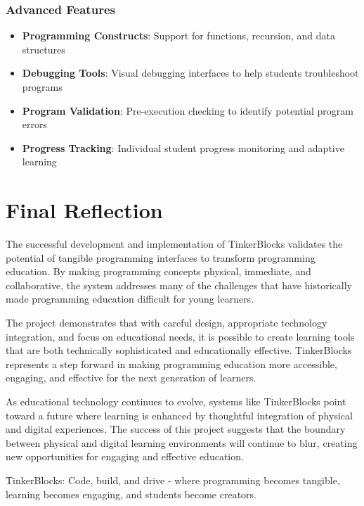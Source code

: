 \subsubsection{Advanced Features}
\begin{itemize}
    \item \textbf{Programming Constructs}: Support for functions, recursion, and data structures
    \item \textbf{Debugging Tools}: Visual debugging interfaces to help students troubleshoot programs
    \item \textbf{Program Validation}: Pre-execution checking to identify potential program errors
    \item \textbf{Progress Tracking}: Individual student progress monitoring and adaptive learning
\end{itemize}

\section{Final Reflection}

The successful development and implementation of TinkerBlocks validates the potential of tangible programming interfaces to transform programming education. By making programming concepts physical, immediate, and collaborative, the system addresses many of the challenges that have historically made programming education difficult for young learners.

The project demonstrates that with careful design, appropriate technology integration, and focus on educational needs, it is possible to create learning tools that are both technically sophisticated and educationally effective. TinkerBlocks represents a step forward in making programming education more accessible, engaging, and effective for the next generation of learners.

As educational technology continues to evolve, systems like TinkerBlocks point toward a future where learning is enhanced by thoughtful integration of physical and digital experiences. The success of this project suggests that the boundary between physical and digital learning environments will continue to blur, creating new opportunities for engaging and effective education.

TinkerBlocks: Code, build, and drive - where programming becomes tangible, learning becomes engaging, and students become creators.